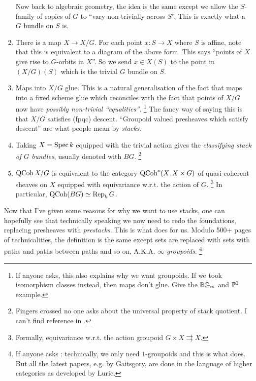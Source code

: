 \documentclass[./main.tex]{subfiles}
\begin{document}
\begin{enumerate}
  Now back to algebraic geometry, the idea is the same
  except we allow the $S$-family of copies of $G$ to 
  ``vary non-trivially across $S$''.
  This is exactly what a $G$ bundle on $S$ is.
  \item There is a map $X \to X / G$.
  For each point $x : S \to X$ where $S$ is affine,
  note that this is equivalent to a diagram 
  of the above form.
  This says ``points of $X$ give rise to $G$-orbits in $X$''.
  So we send $x \in X(S)$ to the point in $(X / G)(S)$
  which is the trivial $G$ bundle on $S$.
  \item Maps into $X / G$ glue.
  This is a natural generalisation of the fact that
  maps into a fixed scheme glue which
  reconciles with the fact that points of $X / G$ now have
  \emph{possibly non-trivial ``equalities''}.
  \footnote{
    If anyone asks,
    this also explains why we want groupoids.
    If we took isomorphism classes instead, then maps don't glue.
    Give the $\mathbb{B} \mathbb{G}_m$ and $\mathbb{P}^1$ example.
  }
  The fancy way of saying this is that $X / G$ satisfies (fpqc) descent.
  ``Groupoid valued presheaves which satisfy descent''
  are what people mean by \emph{stacks}.
  \item Taking $X = \operatorname{Spec} k$ equipped with the trivial action
  gives the \emph{classifying stack of $G$ bundles},
  usually denoted with $BG$.
  \footnote{
    Fingers crossed no one asks about the universal property of
    stack quotient.
    I can't find reference in \cite{lurie-htt}.
  }
  \item $\operatorname{QCoh} X / G$ is equivalent to the category 
  $\operatorname{QCoh}^* (X , X \times G)$ of quasi-coherent sheaves on $X$ equipped with  
  equivariance w.r.t. the action of $G$.
  \footnote{
    Formally, equivariance w.r.t. the action groupoid 
    $G \times X \rightrightarrows X$.
  }
  In particular, $\operatorname{QCoh}(BG) \simeq \operatorname{Rep}_k G$.
\end{enumerate}

Now that I've given some reasons for why we want to use stacks,
one can hopefully see that technically speaking 
we now need to redo the foundations,
replacing presheaves with \emph{prestacks}.
This is what \cite{lurie-htt} does for us.
Modulo 500+ pages of technicalities,
the definition is the same except sets are replaced with
sets with paths and paths between paths and so on,
A.K.A. \emph{$\infty$-groupoids}.
\footnote{
  If anyone asks :
  technically, we only need $1$-groupoids and this is what \cite{BD} does.
  But all the latest papers, e.g. by Gaitsgory,
  are done in the language of higher categories as developed by Lurie.
}
\end{document}
